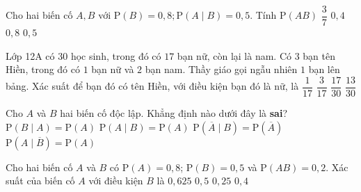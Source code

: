 \begin{ex}%
	Cho hai biến  cố $A,B$ với $\mathrm{P}\left(B\right)=0{,}8;\mathrm{P}\left(A\mid B\right)=0{,}5$. Tính $\mathrm{P}\left(AB\right)$
	\choice 
		{$\dfrac{3}{7}$} 
		{\True $0{,}4$} 
		 {$0{,}8$}
		{$0{,}5$} 
\end{ex}

\begin{ex}%
	Lớp 12A có $30$ học sinh, trong đó có $17$ bạn nữ, còn lại là nam. Có $3$ bạn tên Hiền, trong đó có $1$ bạn  nữ và $2$ bạn nam. Thầy giáo gọi ngẫu nhiên $1$ bạn lên bảng. Xác suất để bạn đó có tên Hiền, với điều kiện bạn đó là nữ, là
	\choice 
		 {$\dfrac{1}{17}$}
		{$\dfrac{3}{17}$} 
		 {$\dfrac{17}{30}$}
		{\True $\dfrac{13}{30}$} 
\end{ex}

\begin{ex}%
	Cho $A$ và $B$ hai biến cố độc lập. Khẳng định nào dưới đây là \textbf{sai}? 
	\choice 
		{\True  $\mathrm{P}(B\mid A)=\mathrm{P}(A)$}
		{$\mathrm{P}(A\mid B)=\mathrm{P}(A)$} 
		 {$\mathrm{P}(\overline{A}\mid B)=\mathrm{P}(\overline{A})$}
		{$\mathrm{P}(A\mid  \overline{B})=\mathrm{P}(A)$}
\end{ex}

\begin{ex}%
	Cho hai biến cố $A$ và $B$ có $\mathrm{P}(A)=0{,}8$; $\mathrm{P}(B)=0{,}5$ và  $\mathrm{P}(AB)=0{,}2$. Xác suất của biến cố $A$ với điều kiện $B$ là
	 \choice
		{$0{,}625$} 
		 {$0{,}5$}
		{$0{,}25$} 
		{\True  $0{,}4$}
\end{ex}

